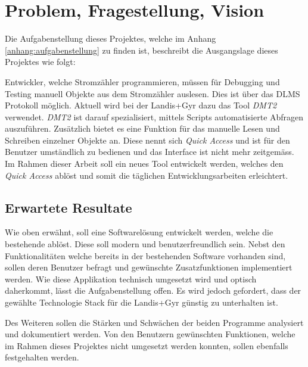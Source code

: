 \chapter{Problem, Fragestellung, Vision}


Die Aufgabenstellung dieses Projektes, welche im Anhang \ref{anhang:aufgabenstellung} zu finden ist, beschreibt die Ausgangslage dieses Projektes wie folgt:

\dq Entwickler, welche Stromzähler programmieren, müssen für Debugging und Testing manuell Objekte aus dem Stromzähler auslesen.
Dies ist über das DLMS Protokoll möglich.
Aktuell wird bei der Landis+Gyr dazu das Tool \textit{DMT2} verwendet.
\textit{DMT2} ist darauf spezialisiert, mittels Scripts automatisierte Abfragen auszuführen.
Zusätzlich bietet es eine Funktion für das manuelle Lesen und Schreiben einzelner Objekte an.
Diese nennt sich \textit{Quick Access} und ist für den Benutzer umständlich zu bedienen und das Interface ist nicht mehr zeitgemäss.
Im Rahmen dieser Arbeit soll ein neues Tool entwickelt werden, welches den \textit{Quick Access} ablöst und somit die täglichen Entwicklungsarbeiten erleichtert.\dq

\section{Erwartete Resultate}\label{erwarteteResultate}
Wie oben erwähnt, soll eine Softwarelösung entwickelt werden, welche die bestehende ablöst.
Diese soll modern und benutzerfreundlich sein.
Nebst den Funktionalitäten welche bereits in der bestehenden Software vorhanden sind, sollen deren Benutzer befragt und gewünschte Zusatzfunktionen implementiert werden.
Wie diese Applikation technisch umgesetzt wird und optisch daherkommt, lässt die Aufgabenstellung offen.
Es wird jedoch gefordert, dass der gewählte Technologie Stack für die Landis+Gyr günstig zu unterhalten ist.

Des Weiteren sollen die Stärken und Schwächen der beiden Programme analysiert und dokumentiert werden.
Von den Benutzern gewünschten Funktionen, welche im Rahmen dieses Projektes nicht umgesetzt werden konnten, sollen ebenfalls festgehalten werden.

